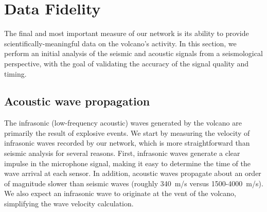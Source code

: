 \section{Data Fidelity}
\label{evaluation-sec-fidelity}

The final and most important measure of our network is its ability to provide
scientifically-meaningful data on the volcano's activity. In this section, we
perform an initial analysis of the seismic and acoustic signals from a
seismological perspective, with the goal of validating the accuracy of the
signal quality and timing.

\subsection{Acoustic wave propagation}

The infrasonic (low-frequency acoustic) waves generated by the volcano are
primarily the result of explosive events. 
We start by measuring the velocity of infrasonic waves recorded by our
network, which is more straightforward than seismic analysis for several
reasons.  First, infrasonic waves generate a clear impulse in the microphone
signal, making it easy to determine the time of the wave arrival at each
sensor. In addition, acoustic waves propagate about an order of magnitude
slower than seismic waves (roughly 340~m/s versus 1500-4000~m/s).
We also expect an infrasonic wave to originate at the vent of the volcano,
simplifying the wave velocity calculation.


